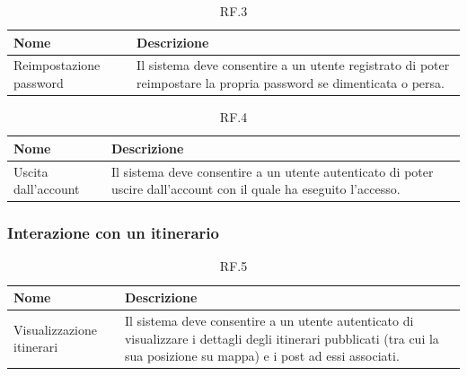 \documentclass{natourDoc}
\begin{document}
\begin{table}[H]
	\centering
	\begin{tabular}{ |p{5cm}|p{10.3cm}| }
		\hline
		\rowcolor{PineGreen!70}
		\textbf{Nome}           & \textbf{Descrizione}                                                                                               \\
		\hline
		Reimpostazione password & Il sistema deve consentire a un utente registrato di poter reimpostare la propria password se dimenticata o persa. \\
		\hline
	\end{tabular}
	\caption{RF.3}

\end{table}

\begin{table}[H]
	\centering
	\begin{tabular}{ |p{5cm}|p{10.3cm}| }
		\hline
		\rowcolor{PineGreen!70}
		\textbf{Nome}       & \textbf{Descrizione}                                                                                                \\
		\hline
		Uscita dall'account & Il sistema deve consentire a un utente autenticato di poter uscire dall'account con il quale ha eseguito l'accesso. \\
		\hline
	\end{tabular}
	\caption{RF.4}

\end{table}


\subsubsection{Interazione con un itinerario}
\begin{table}[H]
	\centering
	\begin{tabular}{ |p{5cm}|p{10.3cm}| }
		\hline
		\rowcolor{PineGreen!70}
		\textbf{Nome}             & \textbf{Descrizione}                                                    \\
		\hline
		Visualizzazione itinerari & Il sistema deve consentire a un utente autenticato di visualizzare i
		dettagli degli itinerari pubblicati (tra cui la sua posizione su mappa) e i post ad essi associati. \\
		\hline
	\end{tabular}
	\caption{RF.5}

\end{table}
\end{document}
